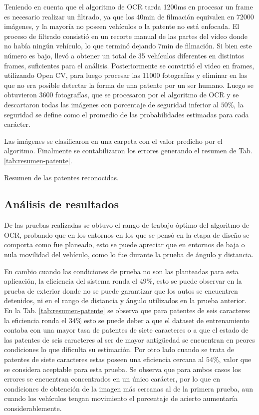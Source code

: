 Teniendo en cuenta que el algoritmo de OCR tarda 1200ms en procesar un frame es necesario realizar un filtrado, ya que los 40min de filmación equivalen en 72000 imágenes, y la mayoría no poseen vehículos o la patente no está enfocada.
El proceso de filtrado consistió en un recorte manual de las partes del video donde no había ningún vehículo, lo que terminó dejando 7min de filmación. Si bien este número es bajo, llevó a obtener un total de 35 vehículos diferentes en distintos frames, suficientes para el análisis. Posteriormente se convirtió el video en frames, utilizando Open CV, para luego procesar las 11000 fotografías y eliminar en las que no era posible detectar la forma de una patente por un ser humano. Luego se obtuvieron 3600 fotografías, que se procesaron por el algoritmo de OCR y se descartaron todas las imágenes con porcentaje de seguridad inferior al $50\%$, la seguridad se define como el promedio de las probabilidades estimadas para cada carácter.

Las imágenes se clasificaron en una carpeta con el valor predicho por el algoritmo.
Finalmente se contabilizaron los errores generando el resumen de Tab. \ref{tab:resumen-patente}.

\begin{table}
    \centering
    
    \caption{Resumen de las patentes reconocidas.}
    \label{tab:resumen-patente}
\end{table}


\subsection{Análisis de resultados}

De las pruebas realizadas se obtuvo el rango de trabajo óptimo del algoritmo de OCR, probando que en los entornos en los que se pensó en la etapa de diseño se comporta como fue planeado, esto se puede apreciar que en entornos de baja o nula movilidad del vehículo, como lo fue durante la prueba de ángulo y distancia.

En cambio cuando las condiciones de prueba no son las planteadas para esta aplicación, la eficiencia del sistema ronda el $49\%$, esto se puede observar en la prueba de exterior donde no se puede garantizar que los autos se encuentren detenidos, ni en el rango de distancia y ángulo utilizados en la prueba anterior.
En la Tab. \ref{tab:resumen-patente} se observa que para patentes de seis caracteres la eficiencia ronda el $34\%$ esto se puede deber a que el dataset de entrenamiento contaba con una mayor tasa de patentes de siete caracteres o a que el estado de las patentes de seis caracteres al ser de mayor antigüedad se encuentran en peores condiciones lo que dificulta su estimación.
Por otro lado cuando se trata de patentes de siete caracteres estas poseen una eficiencia cercana al $54\%$, valor que se considera aceptable para esta prueba.
Se observa que para ambos casos los errores se encuentran concentrados en un único carácter, por lo que en condiciones de obtención de la imagen más cercanas al de la primera prueba, aun cuando los vehículos tengan movimiento el porcentaje de acierto aumentaría considerablemente.

